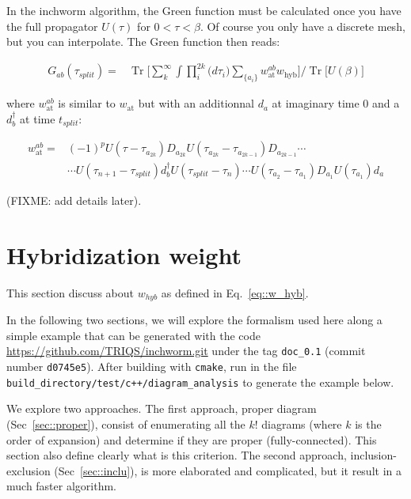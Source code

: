 \documentclass[10pt,letter]{article}
\begin{document}
In the inchworm algorithm, the Green function must be calculated once you have the full propagator $U(\tau)$ for $0 < \tau < \beta$. Of course you only have a discrete mesh, but you can interpolate. The Green function then reads:

\begin{align}
G_{a b}(\tau_{split})=& \operatorname{Tr} \bigg[
\sum_k^{\infty} \int \prod_i^{2k} \Big( d \tau_{i} \Big)  \sum_{\{a_i\}} 
w^{ab}_{\mathrm{at}} w_{\mathrm{hyb}}
\bigg] /   \operatorname{Tr} \big[  U(\beta) \big]
\end{align}

where $w^{ab}_{\mathrm{at}}$ is similar to $w_{\mathrm{at}}$ but with an additionnal $d_a$ at imaginary time $0$ and a $d^{\dagger}_b$ at time $t_{split}$:

\begin{align}
w^{ab}_{\mathrm{at}} =&
(-1)^p
U(\tau-\tau_{a_{2k}}) D_{a_{2k}}
U(\tau_{a_{2k}}-\tau_{a_{2k-1}}) D_{a_{2k-1}}
\cdots   
\label{eq::ordered_order}
\nonumber
\\
&
\cdots 
U(\tau_{n+1}-\tau_{split})
d^\dagger_b 
U(\tau_{split}-\tau_{n})  
\cdots 
U(\tau_{a_2}-\tau_{a_1}) D_{a_1}
U(\tau_{a_{1}})
d_a
\end{align}
%

(FIXME: add details later).




\section{Hybridization weight}
\label{sec::w_hyb}
This section discuss about $w_{hyb}$ as defined in Eq.~\eqref{eq::w_hyb}.

In the following two sections, we will explore the formalism used here along a simple example that can be generated with the code \url{https://github.com/TRIQS/inchworm.git} under the tag \Verb#doc_0.1# (commit number \Verb#d0745e5#). After building with \Verb#cmake#, run in the file \Verb#build_directory/test/c++/diagram_analysis# to generate the example below.

We explore two approaches. The first approach, proper diagram (Sec~\ref{sec::proper}), consist of enumerating all the $k!$ diagrams (where $k$ is the order of expansion) and determine if they are proper (fully-connected). This section also define clearly what is this criterion. The second approach, inclusion-exclusion (Sec~\ref{sec::inclu}), is more elaborated and complicated, but it result in a much faster algorithm.
\end{document}

